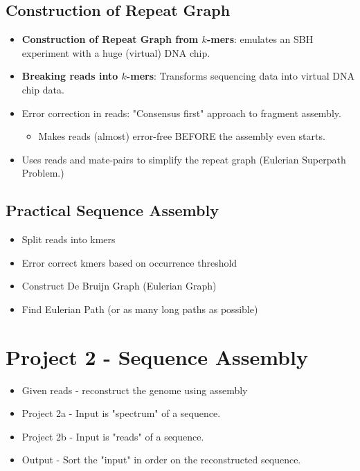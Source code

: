 \documentclass[10pt]{article}
\begin{document}
\subsection*{Construction of Repeat Graph}
\begin{itemize}
    \item \textbf{Construction of Repeat Graph from $k$-mers}: emulates an SBH experiment with a huge (virtual) DNA chip.
    \item \textbf{Breaking reads into $k$-mers}: Transforms sequencing data into virtual DNA chip data.
    \item Error correction in reads: "Consensus first" approach to fragment assembly.
    \begin{itemize}
        \item Makes reads (almost) error-free BEFORE the assembly even starts.
    \end{itemize}
    \item Uses reads and mate-pairs to simplify the repeat graph (Eulerian Superpath Problem.)
\end{itemize}

\subsection*{Practical Sequence Assembly}
\begin{itemize}
    \item Split reads into kmers
    \item Error correct kmers based on occurrence threshold
    \item Construct De Bruijn Graph (Eulerian Graph)
    \item Find Eulerian Path (or as many long paths as possible)
\end{itemize}

\section*{Project 2 - Sequence Assembly}
\begin{itemize}
    \item Given reads - reconstruct the genome using assembly
    \item Project 2a - Input is "spectrum" of a sequence.
    \item Project 2b - Input is "reads" of a sequence.
    \item Output - Sort the "input" in order on the reconstructed sequence.
\end{itemize}
\end{document}
